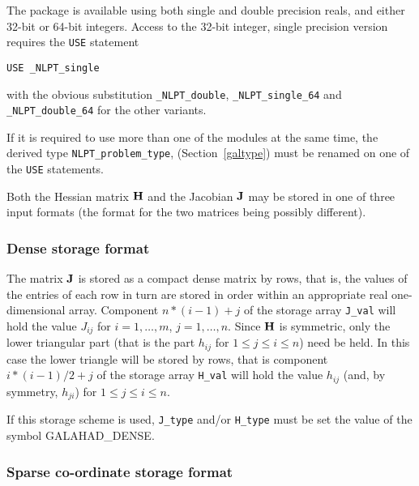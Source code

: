 \documentclass{galahad}
\newcommand{\packagename}{NLPT}
\newcommand{\fullpackagename}{\libraryname\_\packagename}
\newcommand{\sym}{\sf\small}
\begin{document}

\galhowto

The package is available using both single and double precision reals, 
and either 32-bit or 64-bit integers. Access to the 32-bit integer,
single precision version requires the {\tt USE} statement
\medskip

\hspace{8mm} {\tt USE \fullpackagename\_single}

\medskip
\noindent
with the obvious substitution {\tt \fullpackagename\_double},
{\tt \fullpackagename\_single\_64} and 
{\tt \fullpackagename\_double\_64} for the other variants.

\noindent
If it is required to use more than one of the modules at the same time, 
the derived type
{\tt NLPT\_problem\_type}, 
(Section~\ref{galtype})
must be renamed on one of the {\tt USE} statements.


\galmatrix
Both the Hessian matrix ${\mathbf{H}}$ and the Jacobian ${\mathbf{J}}$
may be stored in one of three input formats (the format for the two matrices
being possibly different).

\subsubsection{Dense storage format}\label{dense}

The matrix ${\mathbf{J}}$ is stored as a compact 
dense matrix by rows, that is, the values of the entries of each row in turn are
stored in order within an appropriate real one-dimensional array.
Component $n \ast (i-1) + j$ of the storage array {\tt J\_val} will hold the 
value $J_{ij}$ for $i = 1, \ldots , m$, $j = 1, \ldots , n$.
Since ${\mathbf{H}}$ is symmetric, only the lower triangular part (that is the part 
$h_{ij}$ for $1 \leq j \leq i \leq n$) need be held. In this case
the lower triangle will be stored by rows, that is 
component $i \ast (i-1)/2 + j$ of the storage array {\tt H\_val}  
will hold the value $h_{ij}$ (and, by symmetry, $h_{ji}$)
for $1 \leq j \leq i \leq n$.

\noindent
If this storage scheme is used, {\tt J\_type} and/or {\tt H\_type} must be set
the value of the symbol {\sym GALAHAD\_DENSE}.

\subsubsection{Sparse co-ordinate storage format}\label{coordinate}
\end{document}
